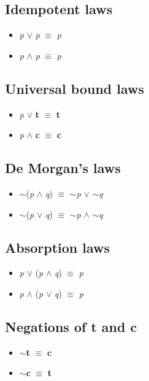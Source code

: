 \documentclass{article}
\begin{document}
\subsection{Idempotent laws}
\begin{itemize}
\item \textit{p} $\lor$ \textit{p} $\equiv$ \textit{p}
\item \textit{p} $\wedge$ \textit{p} $\equiv$ \textit{p}
\end{itemize}

\subsection{Universal bound laws}
\begin{itemize}
\item \textit{p} $\lor$ \textbf{t} $\equiv$ \textbf{t}
\item \textit{p} $\wedge$ \textbf{c} $\equiv$ \textbf{c}
\end{itemize}

\subsection{De Morgan's laws}
\begin{itemize}
\item $\sim$(\textit{p} $\wedge$ \textit{q}) $\equiv$ $\sim$\textit{p} $\lor$ $\sim$\textit{q}
\item $\sim$(\textit{p} $\lor$ \textit{q}) $\equiv$ $\sim$\textit{p} $\wedge$ $\sim$\textit{q}
\end{itemize}

\subsection{Absorption laws}
\begin{itemize}
\item \textit{p} $\lor$ (\textit{p} $\wedge$ \textit{q}) $\equiv$ \textit{p}
\item \textit{p} $\wedge$ (\textit{p} $\lor$ \textit{q}) $\equiv$ \textit{p}
\end{itemize}

\subsection{Negations of t and c}
\begin{itemize}
\item $\sim$\textbf{t} $\equiv$ \textbf{c}
\item $\sim$\textbf{c} $\equiv$ \textbf{t}
\end{itemize}
\end{document}
